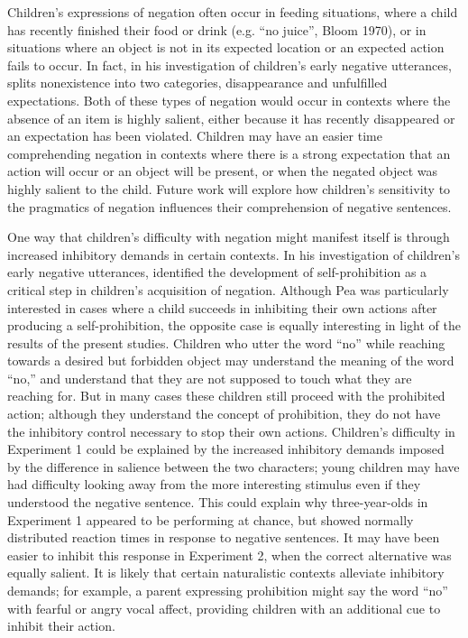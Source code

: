 \documentclass[man]{apa2}
\begin{document}
Children's expressions of negation often occur in feeding situations, where a child has recently finished their food or drink (e.g. ``no juice'', Bloom 1970), or in situations where an object is not in its expected location or an expected action fails to occur.  In fact, in his investigation of children's early negative utterances,  splits nonexistence into two categories, disappearance and unfulfilled expectations.  Both of these types of negation would occur in contexts where the absence of an item is highly salient, either because it has recently disappeared or an expectation has been violated.  Children may have an easier time comprehending negation in contexts where there is a strong expectation that an action will occur or an object will be present, or when the negated object was highly salient to the child.  Future work will explore how children's sensitivity to the pragmatics of negation influences their comprehension of negative sentences.

One way that children's difficulty with negation might manifest itself is through increased inhibitory demands in certain contexts.  In his investigation of children's early negative utterances,  identified the development of self-prohibition as a critical step in children's acquisition of negation.  Although Pea was particularly interested in cases where a child succeeds in inhibiting their own actions after producing a self-prohibition, the opposite case is equally interesting in light of the results of the present studies.  Children who utter the word ``no'' while reaching towards a desired but forbidden object may understand the meaning of the word ``no,'' and understand that they are not supposed to touch what they are reaching for.  But in many cases these children still proceed with the prohibited action; although they understand the concept of prohibition, they do not have the inhibitory control necessary to stop their own actions. Children's difficulty in Experiment 1 could be explained by the increased inhibitory demands imposed by the difference in salience between the two characters; young children may have had difficulty looking away from the more interesting stimulus even if they understood the negative sentence.  This could explain why three-year-olds in Experiment 1 appeared to be performing at chance, but showed normally distributed reaction times in response to negative sentences.  It may have been easier to inhibit this response in Experiment 2, when the correct alternative was equally salient.  It is likely that certain naturalistic contexts alleviate inhibitory demands; for example, a parent expressing prohibition might say the word ``no'' with fearful or angry vocal affect, providing children with an additional cue to inhibit their action.
\end{document}
